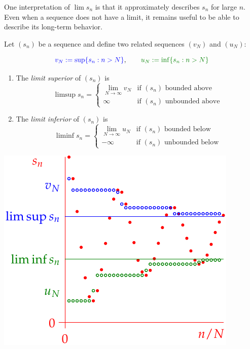 \vspace{-8pt}


\goodbreak




One interpretation of $\lim s_n$ is that it approximately describes $s_n$ for large $n$. Even when a sequence does not have a limit, it remains useful to be able to describe its long-term behavior.


\begin{defn}{}{}
	Let $(s_n)$ be a sequence and define two related sequences $(v_N)$ and $(u_N)$:\par
	\begin{minipage}[t]{0.6\linewidth}\vspace{-12pt}
	\[\textcolor{blue}{v_N:=\sup\{s_n:n>N\}},\qquad \textcolor{Green}{u_N:=\inf\{s_n:n>N\}}\]
	\begin{enumerate}
	  \item The \emph{limit superior} of $(s_n)$ is
	  \[\limsup s_n=\begin{cases}
	  \lim\limits_{N\to\infty}\!v_N\!\!&\text{if $(s_n)$ bounded above}\\
	  \infty&\text{if $(s_n)$ unbounded above}
	  \end{cases}\]
	  \item The \emph{limit inferior} of $(s_n)$ is
	  \[\liminf s_n=\begin{cases}
	  \lim\limits_{N\to\infty}\!u_N\!\!&\text{if $(s_n)$ bounded below}\\
	  -\infty&\text{if $(s_n)$ unbounded below}
	  \end{cases}\]
	\end{enumerate}
	\end{minipage}
	\hfill
	\begin{minipage}[t]{0.39\linewidth}\vspace{-3pt}
		\hfill\includegraphics[scale=0.89]{limsup5}
	\end{minipage}
\end{defn}

